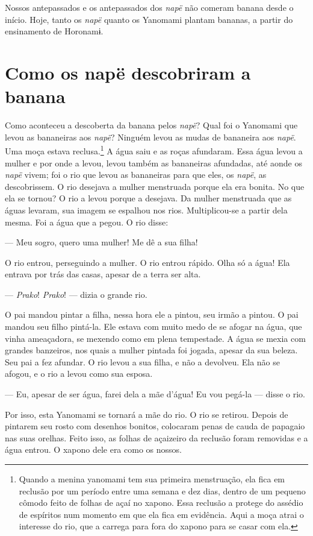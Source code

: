 Nossos antepassados e os antepassados dos \textit{napë} não comeram banana
desde o início. Hoje, tanto os \textit{napë} quanto os Yanomami plantam
bananas, a partir do ensinamento de Horonamɨ.

\section{Como os napë descobriram a banana}

Como aconteceu a descoberta da banana pelos \textit{napë}? Qual foi o
Yanomami que levou as bananeiras aos \textit{napë}? Ninguém levou as mudas
de bananeira aos \textit{napë}. Uma moça estava reclusa.\footnote{Quando a menina yanomami tem sua primeira menstruação, ela fica em
reclusão por um período entre uma semana e dez dias, dentro de um
pequeno cômodo feito de folhas de açaí no xapono. Essa reclusão a
protege do assédio de espíritos num momento em que ela fica em
evidência. Aqui a moça atrai o interesse do rio, que a carrega para fora
do xapono para se casar com ela.} A água saiu
e as roças afundaram. Essa água levou a mulher e por onde a levou, levou
também as bananeiras afundadas, até aonde os \textit{napë} vivem; foi o
rio que levou as bananeiras para que eles, os \textit{napë}, as
descobrissem. O rio desejava a mulher menstruada porque ela era bonita.
No que ela se tornou? O rio a levou porque a desejava. Da mulher
menstruada que as águas levaram, sua imagem se espalhou nos rios.
Multiplicou-se a partir dela mesma. Foi a água que a pegou. O rio
disse: 

--- Meu sogro, quero uma mulher! Me dê a sua filha! 

O rio entrou, perseguindo a mulher. O rio entrou rápido. Olha só a água!
Ela entrava por trás das casas, apesar de a terra ser alta. 

--- \textit{Prako}! \textit{Prako}! --- dizia o grande rio. 

O pai mandou pintar a filha, nessa hora ele a pintou, seu irmão a
pintou. O pai mandou seu filho pintá-la. Ele estava com muito medo de se
afogar na água, que vinha ameaçadora, se mexendo como em plena
tempestade. A água se mexia com grandes banzeiros, nos quais a mulher pintada foi
jogada, apesar da sua beleza. Seu pai a fez afundar. O rio levou a sua filha, e não a devolveu. Ela não se afogou, e o rio a
levou como sua esposa. 

--- Eu, apesar de ser água, farei dela a mãe d'água! Eu vou pegá-la ---
disse o rio. 

Por isso, esta Yanomami se tornará a mãe do rio. O rio se retirou.
Depois de pintarem seu rosto com desenhos bonitos, colocaram penas de
cauda de papagaio nas suas orelhas. Feito isso, as folhas de açaizeiro
da reclusão foram removidas e a água entrou. O xapono dele era como os
nossos. 

